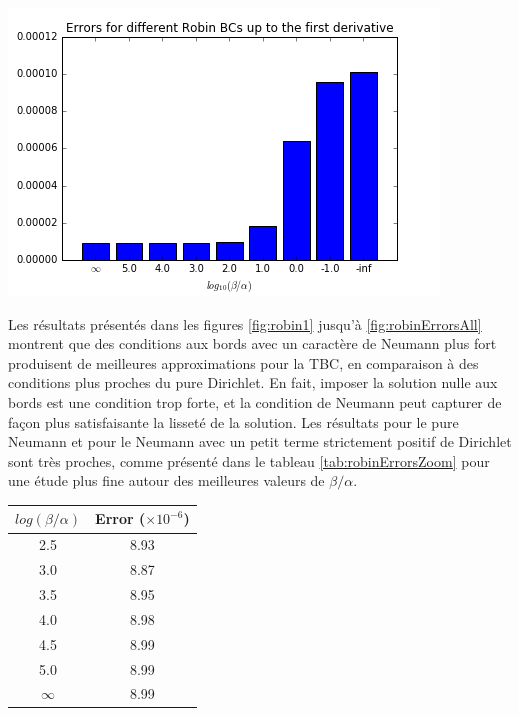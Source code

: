 \begingroup
\begin{center}
		\includegraphics[scale=.6]{figures/robinErrors1.png}
\end{center}
\endgroup

\indent Les résultats présentés dans les figures \ref{fig:robin1} jusqu'à \ref{fig:robinErrorsAll} montrent que des conditions aux bords avec un caractère de Neumann plus fort produisent de meilleures approximations pour la TBC, en comparaison à des conditions plus proches du pure Dirichlet. En fait, imposer la solution nulle aux bords est une condition trop forte, et la condition de Neumann peut capturer de façon plus satisfaisante la lisseté de la solution. Les résultats pour le pure Neumann et pour le Neumann avec un petit terme strictement positif de Dirichlet sont très proches, comme présenté dans le tableau \ref{tab:robinErrorsZoom} pour une étude plus fine autour des meilleures valeurs de $\beta/\alpha$.

\begingroup
\begin{center}
		\begin{tabular}{c|c}
			$log(\beta/\alpha)$ & Error ($\times 10^{-6}$) \\
			\hline
			2.5 & 8.93\\
			3.0 & 8.87\\
			3.5 & 8.95\\
			4.0 & 8.98\\
			4.5 & 8.99\\
			5.0 & 8.99\\
			$\infty$ & 8.99	
		\end{tabular}
\end{center}
\endgroup

